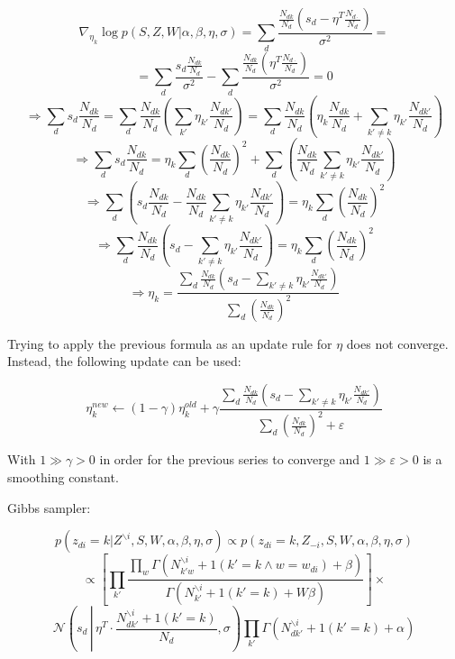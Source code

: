 \documentclass[a4paper,10pt]{article}
\renewcommand{\epsilon}{\varepsilon}
\begin{document}
$$ \nabla_{\eta_k} \log p(S, Z, W | \alpha, \beta, \eta, \sigma) = \sum_d \frac{ \frac{N_{dk}}{N_d} \left( s_d - \eta^T \frac{N_{d\cdot}}{N_d}\right) }{\sigma^2} = $$
$$ = \sum_d \frac{s_d \frac{N_{dk}}{N_d} }{\sigma^2} - \sum_d \frac{ \frac{N_{dk}}{N_d} \left( \eta^T \frac{N_{d\cdot}}{N_d} \right) }{\sigma^2} = 0 $$
$$ \Rightarrow \sum_d s_d \frac{N_{dk}}{N_d} = \sum_d \frac{N_{dk}}{N_d} \left( \sum_{k'} \eta_{k'} \frac{N_{dk'}}{N_d} \right) = \sum_d \frac{N_{dk}}{N_d} \left( \eta_k \frac{N_{dk}}{N_d} + \sum_{k' \ne k} \eta_{k'} \frac{N_{dk'}}{N_d} \right) $$
$$ \Rightarrow \sum_d s_d \frac{N_{dk}}{N_d} = \eta_k \sum_d \left( \frac{N_{dk}}{N_d}  \right)^2 + \sum_d \left( \frac{N_{dk}}{N_d} \sum_{k' \ne k} \eta_{k'} \frac{N_{dk'}}{N_d} \right) $$
$$ \Rightarrow \sum_d \left( s_d \frac{N_{dk}}{N_d} - \frac{N_{dk}}{N_d} \sum_{k' \ne k} \eta_{k'} \frac{N_{dk'}}{N_d} \right) = \eta_k \sum_d \left( \frac{N_{dk}}{N_d}  \right)^2 $$
$$ \Rightarrow \sum_d \frac{N_{dk}}{N_d} \left( s_d - \sum_{k' \ne k} \eta_{k'} \frac{N_{dk'}}{N_d} \right) = \eta_k \sum_d \left( \frac{N_{dk}}{N_d}  \right)^2 $$
$$ \Rightarrow \eta_k = \frac{\sum_d \frac{N_{dk}}{N_d} \left( s_d - \sum_{k' \ne k} \eta_{k'} \frac{N_{dk'}}{N_d} \right)}{\sum_d \left( \frac{N_{dk}}{N_d}  \right)^2} $$

Trying to apply the previous formula as an update rule for $\eta$ does not converge. Instead, the following update can be used:

$$ \eta_k^{new} \leftarrow (1 - \gamma) \eta_k^{old} + \gamma \frac{\sum_d \frac{N_{dk}}{N_d} \left( s_d - \sum_{k' \ne k} \eta_{k'} \frac{N_{dk'}}{N_d} \right)}{\sum_d \left( \frac{N_{dk}}{N_d}  \right)^2 + \epsilon}$$

With $1 \gg \gamma > 0$ in order for the previous series to converge and $1 \gg \epsilon > 0$ is a smoothing constant.

Gibbs sampler:

$$ p(z_{di} = k | Z^{\backslash i}, S, W, \alpha, \beta, \eta, \sigma) \propto p(z_{di} = k, Z_{-i}, S, W, \alpha, \beta, \eta, \sigma) $$
$$ \propto \left[ \prod_{k'} \frac{\prod_w \Gamma(N_{{k'}w}^{\backslash i} + 1(k' = k \wedge w = w_{di}) + \beta)}{\Gamma(N_{k'}^{\backslash i} + 1(k' = k) + W \beta)} \right] \times $$
$$ \mathcal{N}\left(s_d\, \left|\, \eta^T \cdot \frac{N_{d{k'}}^{\backslash i} + 1(k' = k)}{N_d}, \sigma\right. \right) \prod_{k'} \Gamma(N_{d{k'}}^{\backslash i} + 1(k' = k) + \alpha) $$
\end{document}
